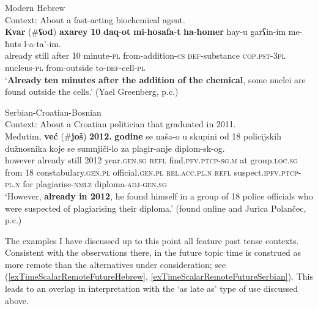 \begin{exe}
	\ex Modern Hebrew\label{exTimeScalarNuclei}\\
	 Context: About a fast-acting biochemical agent.\\
	\gll \textbf{Kvar} (\#\textbf{ʕod})  \textbf{axarey} \textbf{10} \textbf{daq}-\textbf{ot} \textbf{mi}-\textbf{hosafa}-\textbf{t} \textbf{ha}-\textbf{ħomer} hay-u garʕin-im me-ħuts l-a-ta’-im.\\
	already \phantom{\#(}still after 10 minute-\textsc{pl} from-addition-\textsc{cs} \textsc{def}-substance \textsc{cop}.\textsc{pst}-3\textsc{pl} nucleus-\textsc{pl} from-outside to-\textsc{def}-cell-\textsc{pl}\\
	\glt \lq \textbf{Already} \textbf{ten minutes after the addition of the chemical}, some nuclei are found outside the cells.\rq{ }(Yael Greenberg, p.c.)
	
	\ex Serbian-Croatian-Bosnian\label{exTimeScalarPlagiarism}\\
	Context: About a Croatian politician that graduated in 2011.\\
	\gll Međutim, \textbf{već} \textup{(\#}\textbf{još}\textup{)} \textbf{2012.} \textbf{godine} se naša-o u skupini od 18 policijskih dužnosnika koje se sumnjiči-lo za plagir-anje diplom-sk-og.\\
	however already \phantom{(\#}still 2012 year.\textsc{gen}.\textsc{sg} \textsc{refl} find.\textsc{pfv}.\textsc{ptcp}-\textsc{sg}.\textsc{m} at group.\textsc{loc}.\textsc{sg} from 18 constabulary.\textsc{gen}.\textsc{pl} official.\textsc{gen}.\textsc{pl} \textsc{rel}.\textsc{acc}.\textsc{pl}.\textsc{n} \textsc{refl} suspect.\textsc{ipfv}.\textsc{ptcp}-\textsc{pl}.\textsc{n} for plagiarise-\textsc{nmlz} diploma-\textsc{adj}-\textsc{gen}.\textsc{sg}\\
	\glt \lq However, \textbf{already in 2012}, he found himself in a group of 18 police officials who were suspected of plagiarising their diploma.\rq{ }(found online and Jurica Polančec, p.c.)%
\end{exe}

The examples I have discussed up to this point all feature past tense contexts. Consistent with the observations there, in the future topic time is construed as more remote than the alternatives under consideration; see (\ref{exTimeScalarRemoteFutureHebrew}, \ref{exTimeScalarRemoteFutureSerbian}). This leads to an overlap in interpretation with the \lq as late as\rq{ }type of use discussed above.

